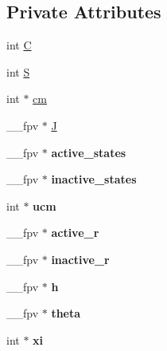 \subsection*{Private Attributes}
\begin{DoxyCompactItemize}
\item 
int \hyperlink{classHC__PNet_a40f377e7056967c60f966101eb986035}{C}
\item 
int \hyperlink{classHC__PNet_a059016e26712e4fd5f6fdbdc6a41ce79}{S}
\item 
int $\ast$ \hyperlink{classHC__PNet_a151d918ab156eda6394ecea56aa1b513}{cm}
\item 
\+\_\+\+\_\+fpv $\ast$ \hyperlink{classHC__PNet_a30c13f798fbcea6d617d09e8f06b7151}{J}
\item 
\+\_\+\+\_\+fpv $\ast$ {\bfseries active\+\_\+states}\hypertarget{classHC__PNet_a9b061bd0e3d89e46f6fabe253fc316fd}{}\label{classHC__PNet_a9b061bd0e3d89e46f6fabe253fc316fd}

\item 
\+\_\+\+\_\+fpv $\ast$ {\bfseries inactive\+\_\+states}\hypertarget{classHC__PNet_a37532e104b8ee801f3a344b68f30109c}{}\label{classHC__PNet_a37532e104b8ee801f3a344b68f30109c}

\item 
int $\ast$ {\bfseries ucm}\hypertarget{classHC__PNet_aa6a29609c184eb93f6f69aa97ed249a0}{}\label{classHC__PNet_aa6a29609c184eb93f6f69aa97ed249a0}

\item 
\+\_\+\+\_\+fpv $\ast$ {\bfseries active\+\_\+r}\hypertarget{classHC__PNet_a91d677edd2ce9a575eaefb2577263b58}{}\label{classHC__PNet_a91d677edd2ce9a575eaefb2577263b58}

\item 
\+\_\+\+\_\+fpv $\ast$ {\bfseries inactive\+\_\+r}\hypertarget{classHC__PNet_a7983d6b96e063925a3a625a3af197802}{}\label{classHC__PNet_a7983d6b96e063925a3a625a3af197802}

\item 
\+\_\+\+\_\+fpv $\ast$ {\bfseries h}\hypertarget{classHC__PNet_a68c66f7d4be2a581fd7f1ef6832ce894}{}\label{classHC__PNet_a68c66f7d4be2a581fd7f1ef6832ce894}

\item 
\+\_\+\+\_\+fpv $\ast$ {\bfseries theta}\hypertarget{classHC__PNet_a757db271f29e1b6a720cf59603c02ab5}{}\label{classHC__PNet_a757db271f29e1b6a720cf59603c02ab5}

\item 
int $\ast$ {\bfseries xi}\hypertarget{classHC__PNet_ad396474173f31c5f4cc3e94d0beb1ed6}{}\label{classHC__PNet_ad396474173f31c5f4cc3e94d0beb1ed6}

\end{DoxyCompactItemize}

